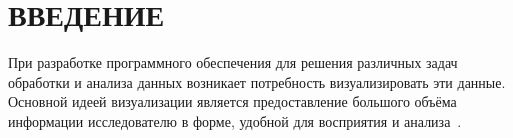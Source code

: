 \chapter*{ВВЕДЕНИЕ}\label{chap.introduction}

При разработке программного обеспечения для решения различных задач обработки и анализа данных возникает потребность визуализировать эти данные. Основной идеей визуализации является предоставление большого объёма информации исследователю в форме, удобной для восприятия и анализа~\cite{Berch2017}.
